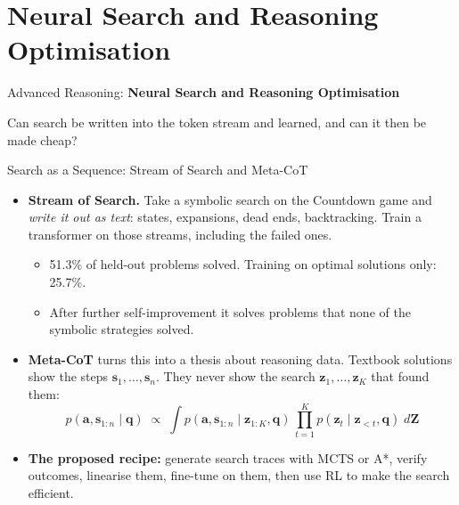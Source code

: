 \section{Neural Search and Reasoning Optimisation}

\begin{frame}{}
    \LARGE Advanced Reasoning: \textbf{Neural Search and Reasoning Optimisation}

    \vspace{1em}
    \normalsize Can search be written into the token stream and learned, and can it then be made cheap?
\end{frame}

\begin{frame}{Search as a Sequence: Stream of Search and Meta-CoT}
    \begin{itemize}\itemsep0.35em
        \item \textbf{Stream of Search.} Take a symbolic search on the Countdown game and \emph{write it out as text}: states, expansions, dead ends, backtracking. Train a transformer on those streams, including the failed ones.
        \begin{itemize}\itemsep0.1em
            \item 51.3\% of held-out problems solved. Training on optimal solutions only: 25.7\%.
            \item After further self-improvement it solves problems that none of the symbolic strategies solved.
        \end{itemize}
        \item \textbf{Meta-CoT} turns this into a thesis about reasoning data. Textbook solutions show the steps $\mathbf{s}_1,\dots,\mathbf{s}_n$. They never show the search $\mathbf{z}_1,\dots,\mathbf{z}_K$ that found them:
        \[
            p(\mathbf a,\mathbf s_{1:n}\mid\mathbf q)\;\propto\;\int p(\mathbf a,\mathbf s_{1:n}\mid\mathbf z_{1:K},\mathbf q)\,\prod_{t=1}^{K}p(\mathbf z_t\mid\mathbf z_{<t},\mathbf q)\;d\mathbf Z
        \]
        \item \textbf{The proposed recipe:} generate search traces with MCTS or A*, verify outcomes, linearise them, fine-tune on them, then use RL to make the search efficient.
    \end{itemize}
    \vspace{0.05em}
\end{frame}

